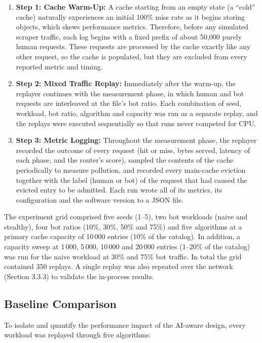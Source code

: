 \begin{enumerate}
    \item \textbf{Step 1: Cache Warm-Up:} A cache starting from an empty state (a ``cold'' cache) naturally experiences an initial 100\% miss rate as it begins storing objects, which skews performance metrics. Therefore, before any simulated scraper traffic, each log begins with a fixed prefix of about 50,000 purely human requests. These requests are processed by the cache exactly like any other request, so the cache is populated, but they are excluded from every reported metric and timing.
    \item \textbf{Step 2: Mixed Traffic Replay:} Immediately after the warm-up, the replayer continues with the measurement phase, in which human and bot requests are interleaved at the file's bot ratio. Each combination of seed, workload, bot ratio, algorithm and capacity was run as a separate replay, and the replays were executed sequentially so that runs never competed for CPU.
    \item \textbf{Step 3: Metric Logging:} Throughout the measurement phase, the replayer recorded the outcome of every request (hit or miss, bytes served, latency of each phase, and the router's score), sampled the contents of the cache periodically to measure pollution, and recorded every main-cache eviction together with the label (human or bot) of the request that had caused the evicted entry to be admitted. Each run wrote all of its metrics, its configuration and the software version to a JSON file.
\end{enumerate}

The experiment grid comprised five seeds (1--5), two bot workloads (naive and stealthy), four bot ratios (10\%, 30\%, 50\% and 75\%) and five algorithms at a primary cache capacity of 10\,000 entries (10\% of the catalog). In addition, a capacity sweep at 1\,000, 5\,000, 10\,000 and 20\,000 entries (1--20\% of the catalog) was run for the naive workload at 30\% and 75\% bot traffic. In total the grid contained 350 replays. A single replay was also repeated over the network (Section 3.3.3) to validate the in-process results.

\subsection{Baseline Comparison}
To isolate and quantify the performance impact of the AI-aware design, every workload was replayed through five algorithms:


